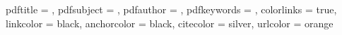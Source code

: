 






\hypersetup
{
    pdftitle    = {\Title},
    pdfsubject  = {\Subject},
    pdfauthor   = {\AuthorOne},
    pdfkeywords = {\KeyWords},
    colorlinks  = true,
    linkcolor   = black,
    anchorcolor = black,
    citecolor   = silver,
    urlcolor    = orange
}


\setlength\parindent{0cm}
